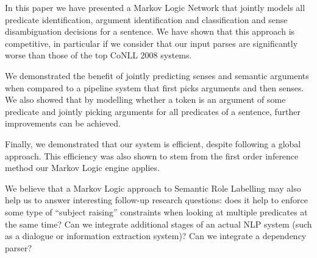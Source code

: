 In this paper we have presented a Markov Logic Network that jointly
models all predicate identification, argument identification and
classification and sense disambiguation decisions for a sentence. We
have shown that this approach is competitive, in particular if we consider that our input parses are
significantly worse than those of the top CoNLL 2008 systems. 

We demonstrated the
benefit of jointly predicting senses and semantic arguments when
compared to a pipeline system that first picks arguments and then
senses. We also showed that by modelling whether a token is an
argument of some predicate and jointly picking arguments for all
predicates of a sentence, further improvements can be achieved.  

Finally, we demonstrated that our system is efficient, despite
following a global approach. This efficiency was also shown to stem
from the first order inference method our Markov Logic engine
applies. 

We believe that a Markov Logic approach to Semantic Role Labelling may
also help us to answer interesting follow-up research questions: does it help to
enforce some type of ``subject raising'' constraints when looking at
multiple predicates at the same time? Can we integrate additional
stages of an actual NLP system (such as a dialogue or information
extraction system)? Can we integrate a dependency parser?     
